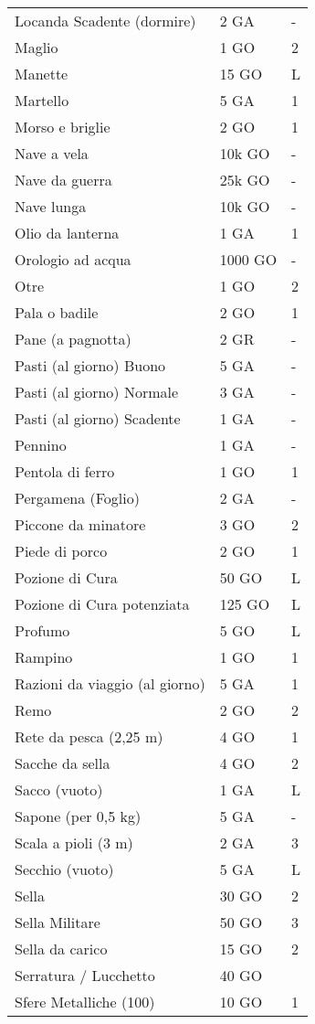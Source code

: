 \documentclass[12pt,a4paper,twoside,openany]{book}
\begin{document}
\begin{multicols}{2}
{\begin{tabularx}{0.42\textwidth}{lll}
Locanda Scadente (dormire) & 2 GA& -\\
Maglio& 1 GO& 2 \\
Manette & 15 GO  & L \\
Martello& 5 GA& 1  \\
Morso e briglie & 2 GO&1\\
Nave a vela & 10k GO & -\\
Nave da guerra  & 25k GO  & -\\
Nave lunga  & 10k GO & -\\
Olio da lanterna& 1 GA& 1 \\
Orologio ad acqua & 1000 GO & -\\
Otre  & 1 GO& 2 \\
Pala o badile & 2 GO& 1 \\
Pane (a pagnotta) & 2 GR& -\\
Pasti (al giorno) Buono & 5 GA&-\\
Pasti (al giorno) Normale& 3 GA&-\\
Pasti (al giorno) Scadente  & 1 GA&-\\
Pennino & 1 GA& - \\
Pentola di ferro  & 1 GO& 1 \\
Pergamena (Foglio)  & 2 GA& - \\
Piccone da minatore & 3 GO& 2 \\
Piede di porco& 2 GO& 1 \\
Pozione di Cura & 50 GO & L\\
Pozione di Cura potenziata & 125 GO & L\\
Profumo & 5 GO & L\\
Rampino & 1 GO& 1 \\
Razioni da viaggio (al giorno)  & 5 GA& 1 \\
Remo  & 2 GO& 2\\
Rete da pesca (2,25 m)& 4 GO& 1 \\
Sacche da sella & 4 GO& 2\\
Sacco (vuoto) & 1 GA& L \\
Sapone (per 0,5 kg) & 5 GA& - \\
Scala a pioli (3 m) & 2 GA& 3 \\
Secchio (vuoto)& 5 GA& L\\
Sella& 30 GO& 2\\
Sella Militare  & 50 GO  & 3\\
Sella da carico & 15 GO  & 2\\
Serratura / Lucchetto & 40 GO&  \\
Sfere Metalliche (100) & 10 GO & 1\\

\end{tabularx}}
\end{multicols}
\end{document}
